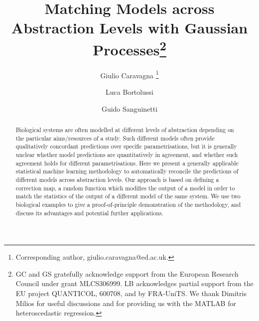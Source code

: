 \documentclass[runningheads,a4paper]{llncs}
\newcommand{\MATLAB}{{\sf MATLAB}}
\begin{document}
\mainmatter  

\title{Matching Models across Abstraction Levels with Gaussian Processes\thanks{GC and GS gratefully acknowledge support from the European Research Council under grant MLCS306999. LB acknowledges partial support from the EU project QUANTICOL, 600708, and by FRA-UniTS. We thank Dimitris Milios for useful discussions and for providing us with the \MATLAB{} for heteroscedastic regression.}}


\author{Giulio Caravagna%
\thanks{Corresponding author, {\sf giulio.caravagna@ed.ac.uk}.}%
\and Luca Bortolussi\and Guido Sanguinetti}




%

\maketitle


\begin{abstract}
Biological systems are often modelled at different levels of abstraction depending on the particular aims/resources of a study. Such different models often provide qualitatively concordant predictions  over specific parametrisations, but it is generally unclear whether model predictions are quantitatively in agreement, and whether such agreement holds for different parametrisations. Here we present a generally applicable statistical machine learning methodology to automatically reconcile the predictions of different models across abstraction levels. Our approach is based on defining a correction map, a random function which modifies the output of a model in order to match the statistics of the output of a different model of the same system. We use two biological examples to give a proof-of-principle demonstration of the methodology, and discuss its advantages  and potential further applications.

\end{abstract}
\end{document}
